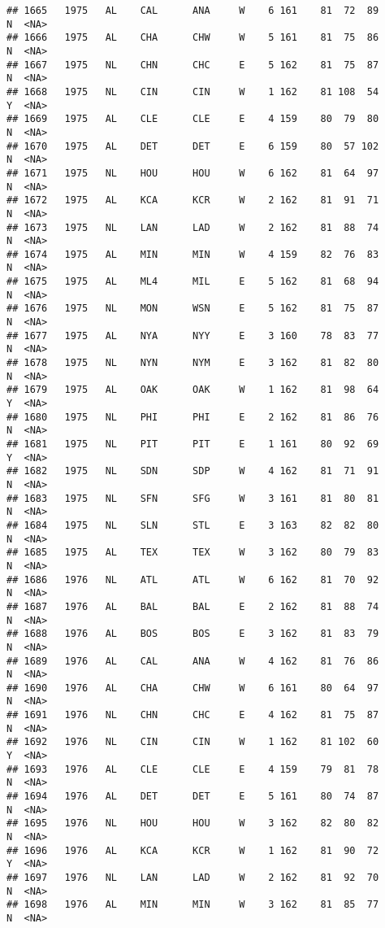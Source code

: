 \documentclass[]{article}
\begin{document}
\begin{verbatim}
## 1665   1975   AL    CAL      ANA     W    6 161    81  72  89      N  <NA>
## 1666   1975   AL    CHA      CHW     W    5 161    81  75  86      N  <NA>
## 1667   1975   NL    CHN      CHC     E    5 162    81  75  87      N  <NA>
## 1668   1975   NL    CIN      CIN     W    1 162    81 108  54      Y  <NA>
## 1669   1975   AL    CLE      CLE     E    4 159    80  79  80      N  <NA>
## 1670   1975   AL    DET      DET     E    6 159    80  57 102      N  <NA>
## 1671   1975   NL    HOU      HOU     W    6 162    81  64  97      N  <NA>
## 1672   1975   AL    KCA      KCR     W    2 162    81  91  71      N  <NA>
## 1673   1975   NL    LAN      LAD     W    2 162    81  88  74      N  <NA>
## 1674   1975   AL    MIN      MIN     W    4 159    82  76  83      N  <NA>
## 1675   1975   AL    ML4      MIL     E    5 162    81  68  94      N  <NA>
## 1676   1975   NL    MON      WSN     E    5 162    81  75  87      N  <NA>
## 1677   1975   AL    NYA      NYY     E    3 160    78  83  77      N  <NA>
## 1678   1975   NL    NYN      NYM     E    3 162    81  82  80      N  <NA>
## 1679   1975   AL    OAK      OAK     W    1 162    81  98  64      Y  <NA>
## 1680   1975   NL    PHI      PHI     E    2 162    81  86  76      N  <NA>
## 1681   1975   NL    PIT      PIT     E    1 161    80  92  69      Y  <NA>
## 1682   1975   NL    SDN      SDP     W    4 162    81  71  91      N  <NA>
## 1683   1975   NL    SFN      SFG     W    3 161    81  80  81      N  <NA>
## 1684   1975   NL    SLN      STL     E    3 163    82  82  80      N  <NA>
## 1685   1975   AL    TEX      TEX     W    3 162    80  79  83      N  <NA>
## 1686   1976   NL    ATL      ATL     W    6 162    81  70  92      N  <NA>
## 1687   1976   AL    BAL      BAL     E    2 162    81  88  74      N  <NA>
## 1688   1976   AL    BOS      BOS     E    3 162    81  83  79      N  <NA>
## 1689   1976   AL    CAL      ANA     W    4 162    81  76  86      N  <NA>
## 1690   1976   AL    CHA      CHW     W    6 161    80  64  97      N  <NA>
## 1691   1976   NL    CHN      CHC     E    4 162    81  75  87      N  <NA>
## 1692   1976   NL    CIN      CIN     W    1 162    81 102  60      Y  <NA>
## 1693   1976   AL    CLE      CLE     E    4 159    79  81  78      N  <NA>
## 1694   1976   AL    DET      DET     E    5 161    80  74  87      N  <NA>
## 1695   1976   NL    HOU      HOU     W    3 162    82  80  82      N  <NA>
## 1696   1976   AL    KCA      KCR     W    1 162    81  90  72      Y  <NA>
## 1697   1976   NL    LAN      LAD     W    2 162    81  92  70      N  <NA>
## 1698   1976   AL    MIN      MIN     W    3 162    81  85  77      N  <NA>

\end{verbatim}
\end{document}
